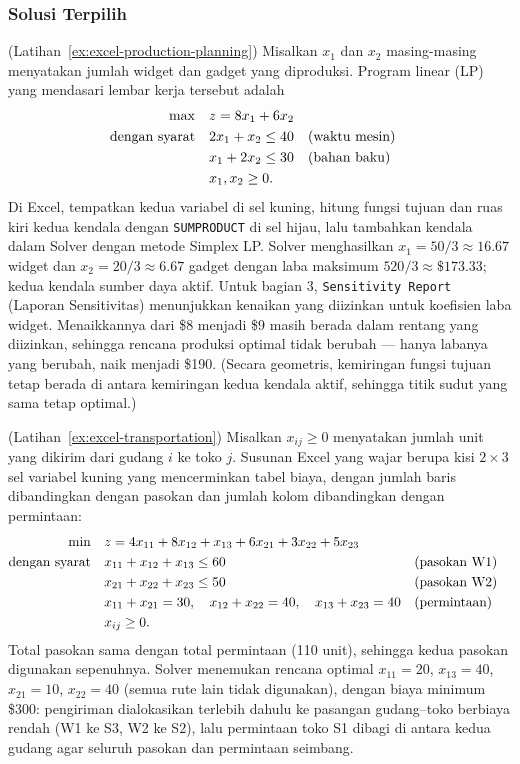 \subsubsection*{Solusi Terpilih}

\begin{solution}(Latihan~\ref{ex:excel-production-planning})
Misalkan $x_1$ dan $x_2$ masing-masing menyatakan jumlah widget dan gadget yang diproduksi.  Program linear (LP) yang mendasari lembar kerja tersebut adalah
\begin{align*}
\max \quad & z = 8x_1 + 6x_2\\
\mbox{dengan syarat}\quad & 2x_1 + x_2 \leq 40 && \mbox{(waktu mesin)}\\
& x_1 + 2x_2 \leq 30 && \mbox{(bahan baku)}\\
& x_1, x_2 \geq 0.
\end{align*}
Di Excel, tempatkan kedua variabel di sel kuning, hitung fungsi tujuan dan ruas kiri kedua kendala dengan \texttt{SUMPRODUCT} di sel hijau, lalu tambahkan kendala dalam Solver dengan metode Simplex LP.  Solver menghasilkan $x_1 = 50/3 \approx 16.67$ widget dan $x_2 = 20/3 \approx 6.67$ gadget dengan laba maksimum $520/3 \approx \$173.33$; kedua kendala sumber daya aktif.
Untuk bagian 3, \texttt{Sensitivity Report} (Laporan Sensitivitas) menunjukkan kenaikan yang diizinkan untuk koefisien laba widget.  Menaikkannya dari \$8 menjadi \$9 masih berada dalam rentang yang diizinkan, sehingga rencana produksi optimal tidak berubah --- hanya labanya yang berubah, naik menjadi \$190.  (Secara geometris, kemiringan fungsi tujuan tetap berada di antara kemiringan kedua kendala aktif, sehingga titik sudut yang sama tetap optimal.)
\end{solution}

\begin{solution}(Latihan~\ref{ex:excel-transportation})
Misalkan $x_{ij} \geq 0$ menyatakan jumlah unit yang dikirim dari gudang $i$ ke toko $j$.  Susunan Excel yang wajar berupa kisi $2 \times 3$ sel variabel kuning yang mencerminkan tabel biaya, dengan jumlah baris dibandingkan dengan pasokan dan jumlah kolom dibandingkan dengan permintaan:
\begin{align*}
\min \quad & z = 4x_{11} + 8x_{12} + x_{13} + 6x_{21} + 3x_{22} + 5x_{23}\\
\mbox{dengan syarat}\quad & x_{11} + x_{12} + x_{13} \leq 60 && \mbox{(pasokan W1)}\\
& x_{21} + x_{22} + x_{23} \leq 50 && \mbox{(pasokan W2)}\\
& x_{11} + x_{21} = 30, \quad x_{12} + x_{22} = 40, \quad x_{13} + x_{23} = 40 && \mbox{(permintaan)}\\
& x_{ij} \geq 0.
\end{align*}
Total pasokan sama dengan total permintaan (110 unit), sehingga kedua pasokan digunakan sepenuhnya.  Solver menemukan rencana optimal $x_{11} = 20$, $x_{13} = 40$, $x_{21} = 10$, $x_{22} = 40$ (semua rute lain tidak digunakan), dengan biaya minimum \$300: pengiriman dialokasikan terlebih dahulu ke pasangan gudang--toko berbiaya rendah (W1 ke S3, W2 ke S2), lalu permintaan toko S1 dibagi di antara kedua gudang agar seluruh pasokan dan permintaan seimbang.
\end{solution}

